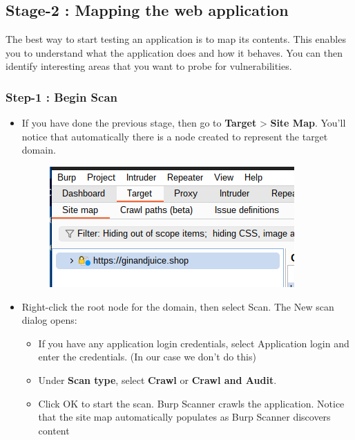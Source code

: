 \documentclass[
	a4paper, %
	12pt, %
]{CSSullivanBusinessReport}
\begin{document}
\subsection*{Stage-2 : Mapping the web application}
\begin{fullwidth}
    The best way to start testing an application is to map its contents. This enables you to understand what the application does and how it behaves. You can then identify interesting areas that you want to probe for vulnerabilities.
    
\subsubsection*{Step-1 : Begin Scan}
\begin{itemize}
    \item If you have done the previous stage, then go to {\color{orange}\textbf{Target}} > {\color{orange}\textbf{Site Map}}. You’ll notice that automatically there is a node created to  represent the target domain.
    \begin{figure}[H]
        \centering
        \includegraphics[width=0.5\linewidth]{Images//Mapping/Site Map-1.png}
        
        
    \end{figure}
    
    \item Right-click the root node for the domain, then select Scan. The New scan dialog opens:
        \begin{itemize}
            \item If you have any application login credentials, select Application login and enter the credentials. (In our case we don’t do this)

            \item Under {\color{orange}\textbf{Scan type}}, select {\color{orange}\textbf{Crawl}} or {\color{orange}\textbf{Crawl and Audit}}.

            \item Click OK to start the scan. Burp Scanner crawls the application. Notice that the site map automatically populates as Burp Scanner discovers content
            

\end{itemize}
\end{itemize}
\end{fullwidth}
\end{document}
